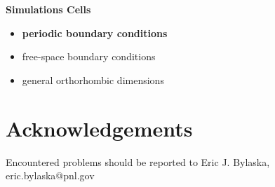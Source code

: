 \large
\textbf{Simulations Cells}
\normalsize

\begin{itemize}
	\item \textbf{periodic boundary conditions}
	\item free-space boundary conditions
	\item general orthorhombic dimensions
\end{itemize}

\section{Acknowledgements}

Encountered problems should be reported to 
Eric J. Bylaska, eric.bylaska@pnl.gov




